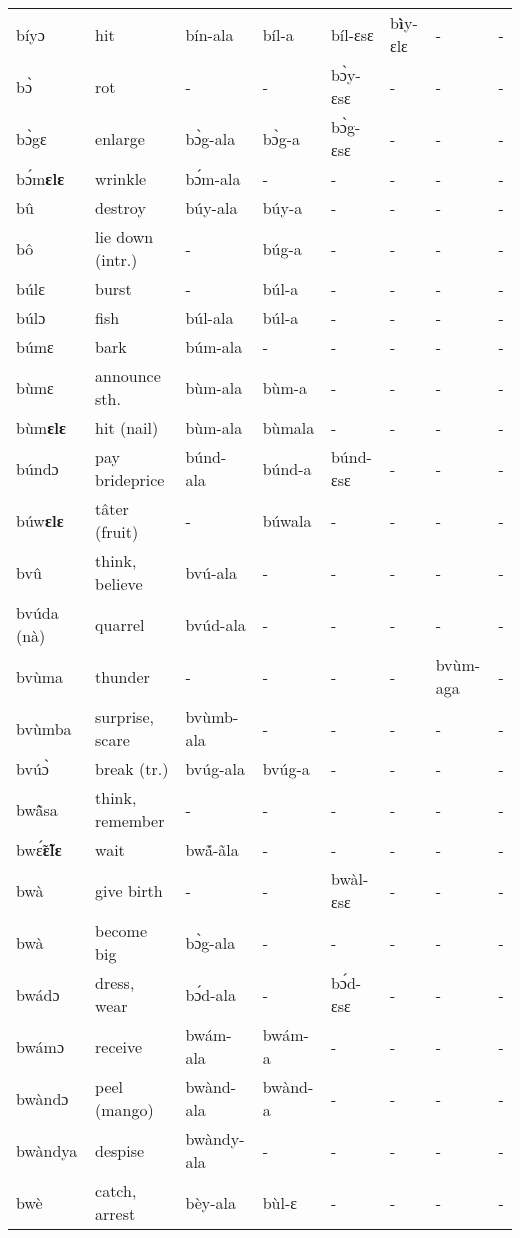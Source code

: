 \begin{sidewaystable}
\begin{longtable}{lp{3.5cm}llllll}
bíyɔ & hit & bín-ala & bíl-a & bíl-ɛsɛ &  b{\bfseries ì}y-ɛlɛ &  - & - \\
bɔ̀ & rot & - & - &  bɔ̀y-ɛsɛ & - & - & - \\
bɔ̀gɛ & enlarge & bɔ̀g-ala & bɔ̀g-a & bɔ̀g-ɛsɛ & - & - & - \\
bɔ́m{\bfseries ɛlɛ} & wrinkle &  bɔ́m-ala & - & - & - & - & - \\
bû & destroy & búy-ala & búy-a & - & - & - & - \\
bô & lie down (intr.) & - & búg-a & - & - & - &  -  \\
búlɛ & burst & - & búl-a & - & - & - & - \\
búlɔ & fish & búl-ala & búl-a & - & -  & - & - \\
búmɛ & bark & búm-ala & - & - & - & - & - \\
bùmɛ & announce sth. & bùm-ala & bùm-a & - & -  & - & - \\
bùm{\bfseries ɛlɛ} & hit (nail) & bùm-ala & bùmala & - & - & - & - \\
búndɔ & pay brideprice & búnd-ala & búnd-a & búnd-ɛsɛ & - & - & - \\
búw{\bfseries ɛlɛ} & tâter (fruit) & - & búwala  & - & - & - & - \\
bvû & think, believe & bvú-ala  & - & - & - & - & - \\
bvúda (nà) & quarrel & bvúd-ala & - & - & - & - & - \\
bvùma & thunder & - & - & -  & - & bvùm-aga & - \\
bvùmba & surprise, scare  & bvùmb-ala & - & - & - & - & -  \\
bvúɔ̀ & break (tr.) & bvúg-ala & bvúg-a & - & - & - & -  \\
bwã̂sa & think, remember  & - & - & - & - & - & - \\
bwɛ̃́{\bfseries ɛ̃lɛ} & wait & bwã́-ãla & - & - & - & - & - \\
bwà & give birth & - & - & bwàl-ɛsɛ & - & - & - \\
bwà & become big & bɔ̀g-ala & - & - & - & - & - \\
bwádɔ & dress, wear & bɔ́d-ala  & - & bɔ́d-ɛsɛ  & - & - & - \\
bwámɔ & receive & bwám-ala & bwám-a & - & - & - & - \\
bwàndɔ & peel (mango) & bwànd-ala & bwànd-a & - & -  & - & - \\
bwàndya & despise &  bwàndy-ala & - & - & - & - & - \\
bwè & catch, arrest & bèy-ala & bùl-ɛ & - & -  & - & - \\

\end{longtable}
\end{sidewaystable}
